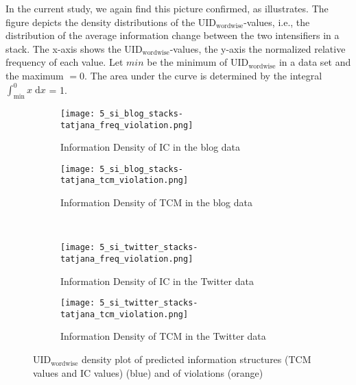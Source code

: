 \documentclass[output=paper,colorlinks,citecolor=brown]{langscibook}
\begin{document}
In the current study, we again find this picture confirmed, as  illustrates. The figure depicts the density distributions of the $\mathrm{UID_{wordwise}}$-values, i.e., the distribution of the average information change between the two intensifiers in a stack. The x-axis shows the $\mathrm{UID_{wordwise}}$-values, the y-axis the normalized relative frequency of each value. Let $min$ be the minimum of $\mathrm{UID_{wordwise}}$ in a data set and the maximum $= 0$. The area under the curve is determined by the integral \(\int_{\min}^{0} x \;\text{d}x\) = 1.

\begin{figure}
  \begin{subfigure}[t]{0.45\textwidth}
  \centering
%     
    \texttt{[image: 5\_si\_blog\_stacks-tatjana\_freq\_violation.png]}
    \caption{Information Density of IC in the blog data}
    \label{fig:UID_blog_ic}
  \end{subfigure}\hfill
  \begin{subfigure}[t]{0.45\textwidth}
  \centering
%     
    \texttt{[image: 5\_si\_blog\_stacks-tatjana\_tcm\_violation.png]}
    \caption{Information Density of TCM in the blog data}
    \label{fig:UID_blog_tcm}
  \end{subfigure}\\
  \begin{subfigure}[t]{0.45\textwidth}
  \centering
%     
    \texttt{[image: 5\_si\_twitter\_stacks-tatjana\_freq\_violation.png]}
    \caption{Information Density of IC in the Twitter data}
    \label{fig:UID_twitter_ic}
  \end{subfigure}\hfill
  \begin{subfigure}[t]{0.45\textwidth}
  \centering
%     
    \texttt{[image: 5\_si\_twitter\_stacks-tatjana\_tcm\_violation.png]}
    \caption{Information Density of TCM in the Twitter data}
    \label{fig:UID_twitter_tcm}
  \end{subfigure}
\caption{$\mathrm{UID_{wordwise}}$ density plot of predicted information structures (TCM values and IC values) (blue) and of violations (orange)}
\label{fig:UID}
\end{figure}
\end{document}
